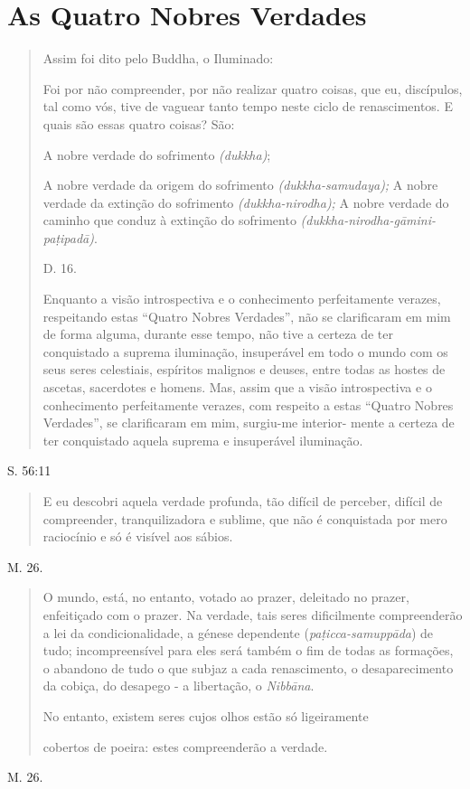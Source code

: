 \part{As Quatro Nobres Verdades}

\begin{quote}
Assim foi dito pelo Buddha, o Iluminado:

Foi por não compreender, por não realizar quatro coisas, que eu, discípulos, tal como vós, tive de vaguear tanto tempo neste ciclo de renascimentos. E quais são essas quatro coisas? São:

A nobre verdade do sofrimento \emph{(dukkha)};

A nobre verdade da origem do sofrimento \emph{(dukkha-samudaya);} A nobre verdade da extinção do sofrimento \emph{(dukkha-nirodha);} A nobre verdade do caminho que conduz à extinção do sofrimento \emph{(dukkha-nirodha-gāmini-paṭipadā)}.

D. 16.

Enquanto a visão introspectiva e o conhecimento perfeitamente verazes, respeitando estas ``Quatro Nobres Verdades'', não se clarificaram em mim de forma alguma, durante esse tempo, não tive a certeza de ter conquistado a suprema iluminação, insuperável em todo o mundo com os seus seres celestiais, espíritos malignos e deuses, entre todas as hostes de ascetas, sacerdotes e homens. Mas, assim que a visão introspectiva e o conhecimento perfeitamente verazes, com respeito a estas ``Quatro Nobres Verdades'', se clarificaram em mim, surgiu-me interior- mente a certeza de ter conquistado aquela suprema e insuperável iluminação.
\end{quote}

S. 56:11

\begin{quote}
E eu descobri aquela verdade profunda, tão difícil de perceber, difícil de compreender, tranquilizadora e sublime, que não é conquistada por mero raciocínio e só é visível aos sábios.
\end{quote}

M. 26.

\begin{quote}
O mundo, está, no entanto, votado ao prazer, deleitado no prazer, enfeitiçado com o prazer. Na verdade, tais seres dificilmente compreenderão a lei da condicionalidade, a génese dependente (\emph{paṭicca-samuppāda}) de tudo; incompreensível para eles será também o fim de todas as formações, o abandono de tudo o que subjaz a cada renascimento, o desaparecimento da cobiça, do desapego - a libertação, o \emph{Nibbāna}.

No entanto, existem seres cujos olhos estão só ligeiramente

cobertos de poeira: estes compreenderão a verdade.
\end{quote}

M. 26.
